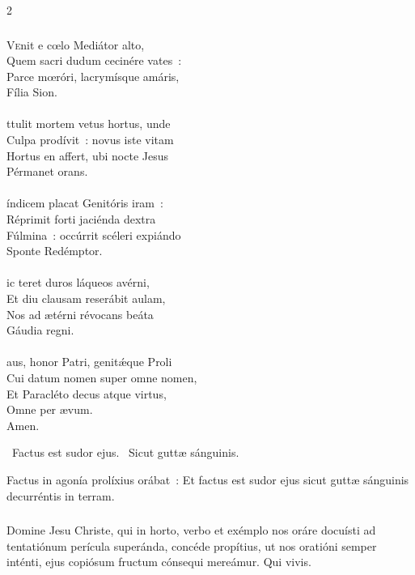 \documentclass[9pt,twoside]{extarticle}
\begin{document}
\begin{multicols}{2}
\subsubsection*{\center{}}
\lettrine{V}enit e cœlo Mediátor alto,\\
Quem sacri dudum cecinére vates~:\\
Parce mœróri, lacrymísque amáris,\\
Fília Sion.\\
\\
ttulit mortem vetus hortus, unde\\
Culpa prodívit~: novus iste vitam\\
Hortus en affert, ubi nocte Jesus\\
Pérmanet orans.\\
\\
índicem placat Genitóris iram~:\\
Réprimit forti jaciénda dextra\\
Fúlmina~: occúrrit scéleri expiándo\\
Sponte Redémptor.\\
\\
ic teret duros láqueos avérni,\\
Et diu clausam reserábit aulam,\\
Nos ad ætérni révocans beáta\\
Gáudia regni.\\
\\
aus, honor Patri, genitǽque Proli\\
Cui datum nomen super omne nomen,\\
Et Paracléto decus atque virtus,\\
Omne per ævum.\\
Amen.

\begin{tightlist}{}
\item {}~Factus est sudor ejus. ~Sicut guttæ sánguinis.
\item {} Factus in agonía prolíxius orábat~: Et factus est sudor ejus sicut guttæ sánguinis decurréntis in terram.
\end{tightlist}
\subsubsection*{\center {}}
\lettrine{D}omine Jesu Christe, qui in horto, verbo et exémplo nos oráre docuísti ad tentatiónum perícula superánda, concéde propítius, ut nos oratióni semper inténti, ejus copiósum fructum cónsequi mereámur. Qui vivis.


\end{multicols}
\end{document}
